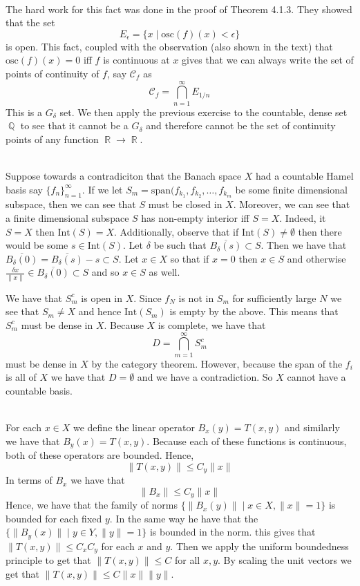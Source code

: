 \documentclass[6pt]{article}
\DeclareMathOperator{\Q}{\mathbb{Q}}
\DeclareMathOperator{\R}{\mathbb{R}}
\DeclareMathOperator{\suchthat}{\mathrel{|}}
\newcommand{\problem}[1]{\noindent{\textbf{Problem #1}}\\}
\newcommand{\norm}[1]{\|#1\|}
\begin{document}
\problem{4.6.6} The hard work for this fact was done in the proof of Theorem 4.1.3. They showed that the set 
\[
E_\epsilon = \{x \suchthat \text{osc}(f)(x) < \epsilon\}
\]
is open. This fact, coupled with the observation (also shown in the text) that $\text{osc}(f)(x) = 0$ iff $f$ is continuous at $x$ gives that we can always write the set of points of continuity of $f$, say $\mathcal{C}_f$ as
\[
\mathcal{C}_f = \bigcap_{n=1}^\infty E_{1/n}
\]
This is a $G_\delta$ set. We then apply the previous exercise to the countable, dense set $\Q$ to see that it cannot be a $G_\delta$ and therefore cannot be the set of continuity points of any function $\R \to \R$. 

\problem{4.6.8} Suppose towards a contradiciton that the Banach space $X$ had a countable Hamel basis say $\{f_n\}_{n=1}^\infty$. If we let $S_m = \text{span}(f_{k_1}, f_{k_2},\ldots , f_{k_m}$ be some finite dimensional subspace, then we can see that $S$ must be closed in $X$. Moreover, we can see that a finite dimensional subspace $S$ has non-empty interior iff $S = X$. Indeed, it $S = X$ then $\text{Int}(S) = X$. Additionally, observe that if $\text{Int}(S) \neq \emptyset$ then there would be some $s \in \text{Int}(S)$. Let $\delta$ be such that $\overline{B_\delta(s)} \subset S$. Then we have that $\overline{B_\delta(0)} = \overline{B_\delta(s)} - s \subset S$. Let $x \in X$ so that if $x = 0$ then $x \in S$ and otherwise $\frac{\delta x}{\norm{x}} \in \overline{B_\delta(0)} \subset S$ and so $x \in S$ as well.  

We have that $S_m^c$ is open in $X$. Since $f_N$ is not in $S_m$ for sufficiently large $N$ we see that $S_m \neq X$ and hence $\text{Int}(S_m)$ is empty by the above. This means that $S_m^c$ must be dense in $X$. Because $X$ is complete, we have that 
\[
D = \bigcap_{m=1}^\infty S_m^c
\]
must be dense in $X$ by the category theorem. However, because the span of the $f_i$ is all of $X$ we have that $D = \emptyset$ and we have a contradiction. So $X$ cannot have a countable basis. 

\problem{4.6.12} For each $x \in X$ we define the linear operator $B_x(y) = T(x,y)$ and similarly we have that $B_y(x) = T(x,y)$. Because each of these functions is continuous, both of these operators are bounded. Hence,
\[
\norm{T(x,y)} \leq C_y\norm{x}
\]
In terms of $B_x$ we have that 
\[
\norm{B_x} \leq C_y\norm{x}
\]
Hence, we have that the family of norms $\{\norm{B_x(y)} \suchthat x \in X, \norm{x} = 1\}$ is bounded for each fixed $y$. In the same way he have that the $\{\norm{B_y(x)} \suchthat y \in Y, \norm{y} = 1\}$ is bounded in the norm. this gives that $\norm{T(x,y)} \leq C_xC_y$ for each $x$ and $y$. Then we apply the uniform boundedness principle to get that $\norm{T(x,y)} \leq C$ for all $x,y$. By scaling the unit vectors we get that $\norm{T(x,y)} \leq C\norm{x}\norm{y}$. 
\end{document}
